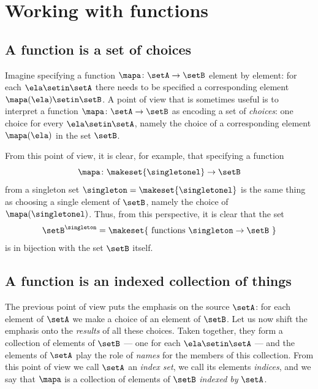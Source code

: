 

\section{Working with functions}
\label{sec:functions-working}





\subsection{A function is a set of choices}
Imagine specifying a function $\mapa \colon \setA \to \setB$ element by element: for each $\ela \setin \setA$ there needs to be specified a corresponding element  $\mapa(\ela) \setin \setB$. A point of view that is sometimes useful is to interpret  a function $\mapa \colon \setA \to \setB$ as encoding a set of \emph{choices}: one choice for every $\ela \setin \setA$, namely the choice of a corresponding element $\mapa(\ela)$ in the set $\setB$. 

From this point of view, it is clear, for example, that specifying a function 
\begin{equation}
\mapa \colon \makeset{\singletonel} \to \setB
\end{equation}
from a singleton set $\singleton = \makeset{\singletonel}$ is the same thing as choosing a single element of $\setB$, namely the choice of $\mapa(\singletonel)$. Thus, from this perspective, it is clear that the set
\begin{equation}
\setB^\singleton = \makeset{ \text{ functions } \singleton \to \setB \ }
\end{equation}
is in bijection with the set $\setB$ itself. 

\subsection{A function is an indexed collection of things}
\label{sec:function-as-indexed-collection}

The previous point of view puts the emphasis on the source $\setA$: for each element of $\setA$ we make a choice of an element of $\setB$. Let us now shift the emphasis onto the \emph{results} of all these choices. Taken together, they form a collection of elements of $\setB$ --- one for each $\ela \setin \setA$ --- and the elements of $\setA$ play the role of \emph{names} for the members of this collection. From this point of view we call $\setA$ an \emph{index set}, we call its elements \emph{indices}, and we say that $\mapa$ is a collection of elements of $\setB$ \emph{indexed by} $\setA$.

